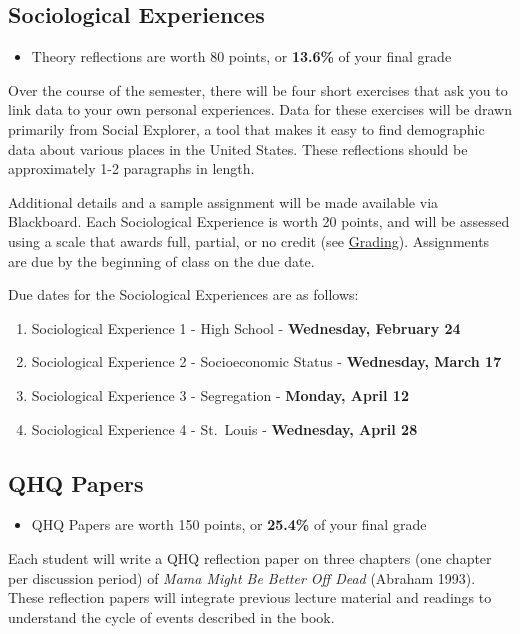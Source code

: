 \documentclass[
]{book}
\providecommand{\tightlist}{%
  \setlength{\itemsep}{0pt}\setlength{\parskip}{0pt}}
\newenvironment{rmdblock}[1]
  {\begin{shaded*}
  \begin{itemize}
  \renewcommand{\labelitemi}{
    \raisebox{-.7\height}[0pt][0pt]{
      {\setkeys{Gin}{width=3em,keepaspectratio}\texttt{[image: images/\#1]}}
    }
  }
  \item
  }
  {
  \end{itemize}
  \end{shaded*}
  }
\newenvironment{rmdtip}
  {\begin{rmdblock}{tip}}
  {\end{rmdblock}}
\begin{document}
\hypertarget{sociological-experiences}{%
\subsection{Sociological Experiences}\label{sociological-experiences}}

\begin{rmdtip}
Theory reflections are worth 80 points, or \textbf{13.6\%} of your final
grade
\end{rmdtip}

Over the course of the semester, there will be four short exercises that ask you to link data to your own personal experiences. Data for these exercises will be drawn primarily from Social Explorer, a tool that makes it easy to find demographic data about various places in the United States. These reflections should be approximately 1-2 paragraphs in length.

Additional details and a sample assignment will be made available via Blackboard. Each Sociological Experience is worth 20 points, and will be assessed using a scale that awards full, partial, or no credit (see \href{grading.html}{Grading}). Assignments are due by the beginning of class on the due date.

Due dates for the Sociological Experiences are as follows:

\begin{enumerate}
\def\labelenumi{\arabic{enumi}.}
\tightlist
\item
  Sociological Experience 1 - High School - \textbf{Wednesday, February 24}
\item
  Sociological Experience 2 - Socioeconomic Status - \textbf{Wednesday, March 17}
\item
  Sociological Experience 3 - Segregation - \textbf{Monday, April 12}
\item
  Sociological Experience 4 - St.~Louis - \textbf{Wednesday, April 28}
\end{enumerate}

\hypertarget{qhq-papers}{%
\subsection{QHQ Papers}\label{qhq-papers}}

\begin{rmdtip}
QHQ Papers are worth 150 points, or \textbf{25.4\%} of your final grade
\end{rmdtip}

Each student will write a QHQ reflection paper on three chapters (one chapter per discussion period) of \emph{Mama Might Be Better Off Dead} (Abraham 1993). These reflection papers will integrate previous lecture material and readings to understand the cycle of events described in the book.
\end{document}
